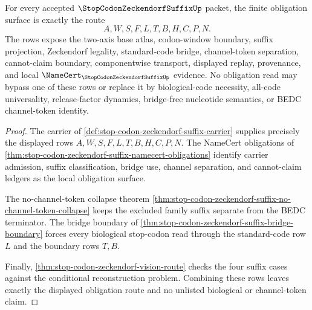 \begin{theorem}
\label{thm:stop-codon-zeckendorf-suffix-obligation-closure-route}
For every accepted $\StopCodonZeckendorfSuffixUp$ packet, the finite obligation surface is exactly the route
$$
A,W,S,F,L,T,B,H,C,P,N.
$$
The rows expose the two-axis base atlas, codon-window boundary, suffix projection, Zeckendorf legality, standard-code bridge, channel-token separation, cannot-claim boundary, componentwise transport, displayed replay, provenance, and local $\NameCert_{\StopCodonZeckendorfSuffixUp}$ evidence. No obligation read may bypass one of these rows or replace it by biological-code necessity, all-code universality, release-factor dynamics, bridge-free nucleotide semantics, or BEDC channel-token identity.
\end{theorem}
\begin{proof}
The carrier of \autoref{def:stop-codon-zeckendorf-suffix-carrier} supplies precisely the displayed rows $A,W,S,F,L,T,B,H,C,P,N$. The NameCert obligations of \autoref{thm:stop-codon-zeckendorf-suffix-namecert-obligations} identify carrier admission, suffix classification, bridge use, channel separation, and cannot-claim ledgers as the local obligation surface.

The no-channel-token collapse theorem \autoref{thm:stop-codon-zeckendorf-suffix-no-channel-token-collapse} keeps the excluded family suffix separate from the BEDC terminator. The bridge boundary of \autoref{thm:stop-codon-zeckendorf-suffix-bridge-boundary} forces every biological stop-codon read through the standard-code row $L$ and the boundary rows $T,B$.

Finally, \autoref{thm:stop-codon-zeckendorf-vision-route} checks the four suffix cases against the conditional reconstruction problem. Combining these rows leaves exactly the displayed obligation route and no unlisted biological or channel-token claim.
\end{proof}



